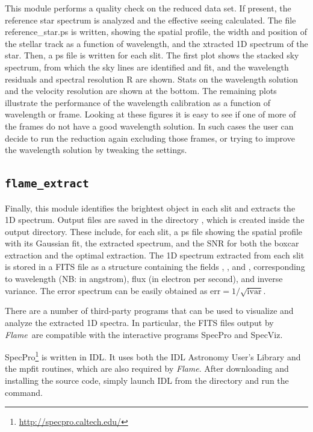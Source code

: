 \documentclass[a4paper]{article}
\newcommand{\flame}{\emph{Flame}}
\begin{document}
\begin{sloppypar}
This module performs a quality check on the reduced data set. If present, the reference star spectrum is analyzed and the effective seeing calculated. The file reference\_star.ps is written, showing the spatial profile, the width and position of the stellar track as a function of wavelength, and the xtracted 1D spectrum of the star. Then, a ps file is written for each slit. The first plot shows the stacked sky spectrum, from which the sky lines are identified and fit, and the wavelength residuals and spectral resolution R are shown. Stats on the wavelength solution and the velocity resolution are shown at the bottom. The remaining plots illustrate the performance of the wavelength calibration as a function of wavelength or frame. Looking at these figures it is easy to see if one of more of the frames do not have a good wavelength solution. In such cases the user can decide to run the reduction again excluding those frames, or trying to improve the wavelength solution by tweaking the settings.



\subsection{\texttt{flame\_extract}}

Finally, this module identifies the brightest object in each slit and extracts the 1D spectrum. Output files are saved in the directory , which is created inside the output directory. These include, for each slit, a ps file showing the spatial profile with its Gaussian fit, the extracted spectrum, and the SNR for both the boxcar extraction and the optimal extraction. The 1D spectrum extracted from each slit is stored in a FITS file as a structure containing the fields , , and , corresponding to wavelength (NB: in angstrom), flux (in electron per second), and inverse variance. The error spectrum can be easily obtained as $\mathrm{err} = 1/\sqrt{\mathrm{ivar}}$.

There are a number of third-party programs that can be used to visualize and analyze the extracted 1D spectra. In particular, the FITS files output by \flame\ are compatible with the interactive programs SpecPro and SpecViz.

SpecPro\footnote{\url{http://specpro.caltech.edu/}} is written in IDL. It uses both the IDL Astronomy User's Library and the mpfit routines, which are also required by \flame. After downloading and installing the source code, simply launch IDL from the  directory and run the  command.


\end{sloppypar}
\end{document}
